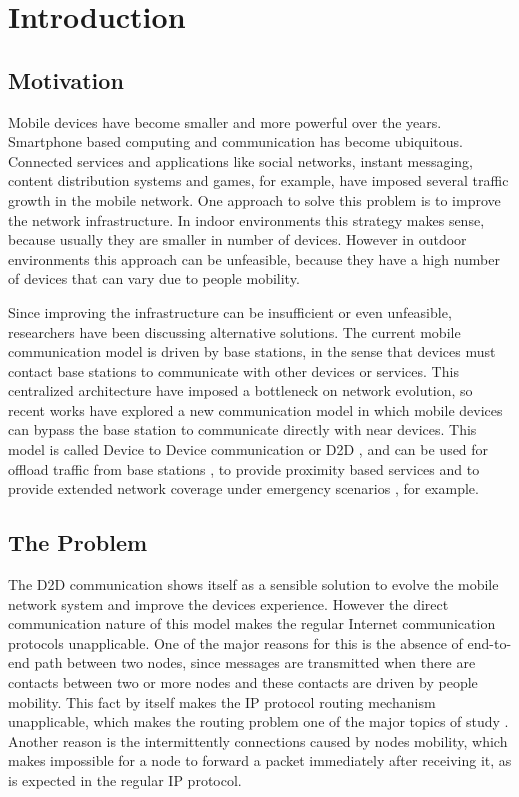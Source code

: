 \chapter{Introduction}
\label{ch:Introduction}

\section{Motivation}
\label{sec:intro.motivation}

Mobile devices have become smaller and more powerful over the years. Smartphone based computing and communication has become ubiquitous.
Connected services and applications like social networks, instant messaging, content distribution systems and games, for example, have imposed several traffic growth in the mobile network. One approach to solve this problem is to improve the network infrastructure. In indoor environments this strategy makes sense, because usually they are smaller in number of devices. However in outdoor environments this approach can be unfeasible, because they have a high number of devices that can vary due to people mobility.

Since improving the infrastructure can be insufficient or even unfeasible, researchers have been discussing alternative solutions. The current mobile communication model is driven by base stations, in the sense that devices must contact base stations to communicate with other devices or services. This centralized architecture have imposed a bottleneck on network evolution, so recent works have explored a new communication model in which mobile devices can bypass the base station to communicate directly with near devices. This model is called Device to Device communication or D2D \citep{yang2013solving}, and can be used for offload traffic from base stations \citep*{yang2013solving, nunes2016leveraging, aijaz2013survey, pyattaev2013proximity, andreev2014cellular, bastug2014living}, to provide proximity based services \citep{lin2014overview} and to provide extended network coverage under emergency scenarios \citep{babun2015multi}, for example.

\section{The Problem}
\label{sec:intro.problemStatement}

The D2D communication shows itself as a sensible solution to evolve the mobile network system and improve the devices experience. However the direct communication nature of this model makes the regular Internet communication protocols unapplicable. One of the major reasons for this is the absence of end-to-end path between two nodes, since messages are transmitted when there are contacts between two or more nodes and these contacts are driven by people mobility. This fact by itself makes the IP protocol routing mechanism unapplicable, which makes the routing problem one of the major topics of study \citep{misra2016opportunistic}. Another reason is the intermittently connections caused by nodes mobility, which makes impossible for a node to forward a packet immediately after receiving it, as is expected in the regular IP protocol.

